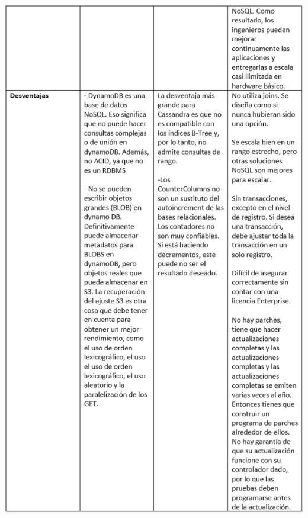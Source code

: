 \documentclass[twoside,onecolumn]{article}
\begin{document}
\begin{flushright}
\begin{itemize}
\includegraphics[scale=0.7]{Imagenes/tabla3.png}
\textbf{}\\



\end{itemize}
\end{flushright}
\end{document}
